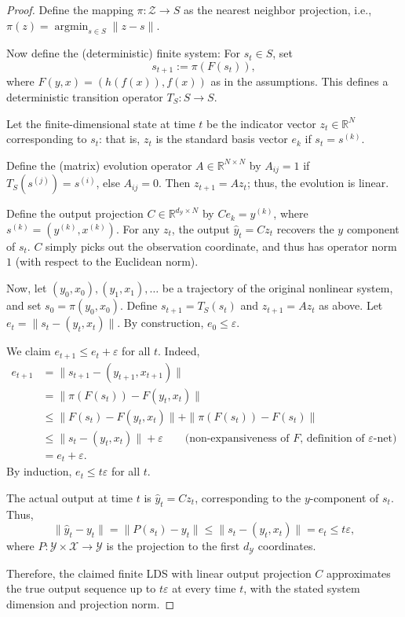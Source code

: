 \documentclass[11pt]{article}
\def\epsilon{\varepsilon}
\numberwithin{equation}{section}
\begin{document}
{\begin{proof}
Define the mapping $\pi: \mathcal{Z} \to S$ as the nearest neighbor projection, i.e., $\pi(z) = \operatorname{argmin}_{s \in S} \|z - s\|$.

Now define the (deterministic) finite system: For $s_t \in S$, set
\[
s_{t+1} := \pi(F(s_t)),
\]
where $F(y, x) = (h(f(x)), f(x))$ as in the assumptions. This defines a deterministic transition operator $T_S: S \to S$.

Let the finite-dimensional state at time $t$ be the indicator vector $z_t \in \mathbb{R}^N$ corresponding to $s_t$: that is, $z_t$ is the standard basis vector $e_k$ if $s_t = s^{(k)}$.

Define the (matrix) evolution operator $A \in \mathbb{R}^{N \times N}$ by $A_{ij} = 1$ if $T_S(s^{(j)}) = s^{(i)}$, else $A_{ij} = 0$. Then $z_{t+1} = Az_t$; thus, the evolution is linear.

Define the output projection $C \in \mathbb{R}^{d_{\mathcal{Y}} \times N}$ by $C e_k = y^{(k)}$, where $s^{(k)} = (y^{(k)}, x^{(k)})$. For any $z_t$, the output $\hat{y}_t = C z_t$ recovers the $y$ component of $s_t$. $C$ simply picks out the observation coordinate, and thus has operator norm $1$ (with respect to the Euclidean norm).

Now, let $(y_0, x_0), (y_1, x_1), \ldots$ be a trajectory of the original nonlinear system, and set $s_0 = \pi(y_0, x_0)$. Define $s_{t+1} = T_S(s_t)$ and $z_{t+1} = Az_t$ as above. Let $e_t = \|s_t - (y_t, x_t)\|$. By construction, $e_0 \leq \epsilon$.

We claim $e_{t+1} \leq e_t + \epsilon$ for all $t$. Indeed,
\begin{align*}
e_{t+1} &= \|s_{t+1} - (y_{t+1}, x_{t+1})\| \\
&= \|\pi(F(s_t)) - F(y_t, x_t)\| \\
&\leq \|F(s_t) - F(y_t, x_t)\| + \|\pi(F(s_t)) - F(s_t)\| \\
&\leq \|s_t - (y_t, x_t)\| + \epsilon \qquad \text{(non-expansiveness of $F$, definition of $\epsilon$-net)} \\
&= e_t + \epsilon.
\end{align*}
By induction, $e_t \leq t \epsilon$ for all $t$.

The actual output at time $t$ is $\hat{y}_t = C z_t$, corresponding to the $y$-component of $s_t$. Thus,
\[
\|\hat{y}_t - y_t\| = \|P(s_t) - y_t\| \leq \|s_t - (y_t, x_t)\| = e_t \leq t\epsilon,
\]
where $P: \mathcal{Y} \times \mathcal{X} \to \mathcal{Y}$ is the projection to the first $d_{\mathcal{Y}}$ coordinates.

Therefore, the claimed finite LDS with linear output projection $C$ approximates the true output sequence up to $t\epsilon$ at every time $t$, with the stated system dimension and projection norm.

\end{proof}
}
\end{document}
